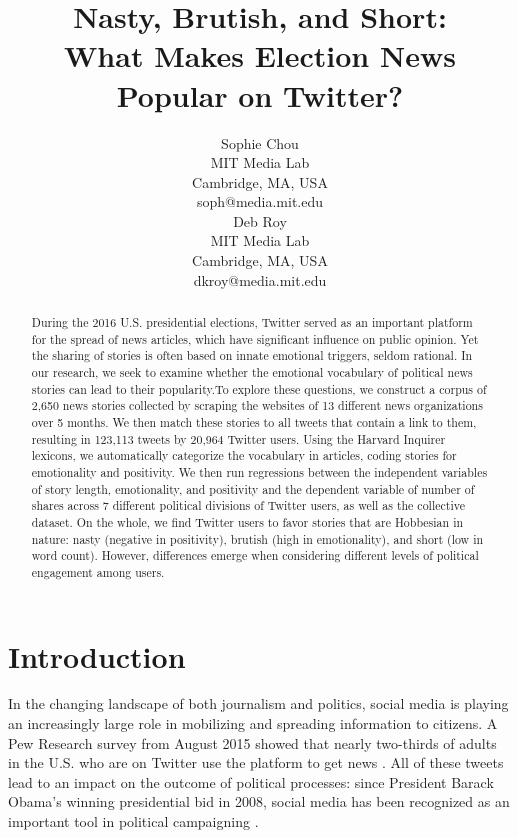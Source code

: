\documentclass[letterpaper]{article}
\begin{document}
%
\title{Nasty, Brutish, and Short:\\
What Makes Election News Popular on Twitter?}
\author{Sophie Chou\\
MIT Media Lab\\
Cambridge, MA, USA\\
soph@media.mit.edu\\
\And
Deb Roy\\
MIT Media Lab\\
Cambridge, MA, USA\\
dkroy@media.mit.edu\\
}
\maketitle
\begin{abstract}
During the 2016 U.S. presidential elections, Twitter served as an important platform for the spread of news articles, which have significant influence on public opinion. Yet the sharing of stories is often based on innate emotional triggers, seldom rational. In our research, we seek to examine whether the emotional vocabulary of political news stories can lead to their popularity.To explore these questions, we construct a corpus of 2,650 news stories collected by scraping the websites of 13 different news organizations over 5 months. We then match these stories to all tweets that contain a link to them, resulting in 123,113 tweets by 20,964 Twitter users. Using the Harvard Inquirer lexicons, we automatically categorize the vocabulary in articles, coding stories for emotionality and positivity. We then run regressions between the independent variables of story length, emotionality, and positivity and the dependent variable of number of shares across 7 different political divisions of Twitter users, as well as the collective dataset. On the whole, we find Twitter users to favor stories that are Hobbesian in nature: nasty (negative in positivity), brutish (high in emotionality), and short (low in word count). However, differences emerge when considering different levels of political engagement among users.

\end{abstract}

 
\section{Introduction}
In the changing landscape of both journalism and politics, social media is playing an increasingly large role in mobilizing and spreading information to citizens. A Pew Research survey from August 2015 showed that nearly two-thirds of adults in the U.S. who are on Twitter use the platform to get news \cite{pew-Twitter-news}. All of these tweets lead to an impact on the outcome of political processes: since President Barack Obama's winning presidential bid in 2008, social media has been recognized as an important tool in political campaigning \cite{cogburn2011networked}. %
 
\end{document}

